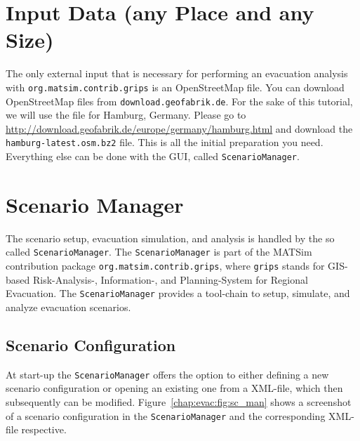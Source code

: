 \section{Input Data (any Place and any Size)}\label{grips:input}
The only external input that is necessary for performing an evacuation analysis with \lstinline|org.matsim.contrib.grips| is an OpenStreetMap file.
You can download OpenStreetMap files from 
\lstinline+download.geofabrik.de+.
For the sake of this tutorial, we will use the file for Hamburg, Germany. 
Please go to \url{http://download.geofabrik.de/europe/germany/hamburg.html} and download the \lstinline+hamburg-latest.osm.bz2+ file. This is all the initial preparation you need. Everything else can 
be done with the GUI, called \lstinline+ScenarioManager+.

\section{Scenario Manager}\label{grips:scm}
The scenario setup, evacuation simulation, and analysis is handled by the so called \lstinline+ScenarioManager+.
The \lstinline+ScenarioManager+ is part of the MATSim contribution package \lstinline+org.matsim.contrib.grips+, where \lstinline+grips+ stands for GIS-based Risk-Analysis-, Information-, and Planning-System for Regional Evacuation.
The \lstinline+ScenarioManager+ provides a tool-chain to setup, simulate, and analyze evacuation scenarios.

\subsection{Scenario Configuration}
At start-up the \lstinline+ScenarioManager+ offers the option to either defining a new scenario configuration or opening an existing one from a XML-file, which then subsequently can be modified. Figure~\ref{chap:evac:fig:sc_man} shows a screenshot of a scenario configuration in the \lstinline+ScenarioManager+ and the corresponding XML-file respective.

